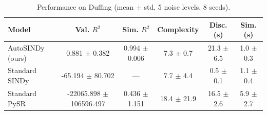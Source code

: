 \begin{table}[htbp]
\centering
\small
\renewcommand{\arraystretch}{1.2}
\caption{Performance on Duffing (mean $\pm$ std, 5 noise levels, 8 seeds).}
\label{tab:autosindy_duffing}
\begin{tabular}{lccccc}
\toprule
Model & Val. $R^2$ & Sim. $R^2$ & Complexity & Disc. (s) & Sim. (s) \\
\midrule
AutoSINDy (ours) & 0.881 $\pm$ 0.382 & 0.994 $\pm$ 0.006 & 7.3 $\pm$ 0.7 & 21.3 $\pm$ 6.5 & 1.0 $\pm$ 0.3 \\
Standard SINDy & -65.194 $\pm$ 80.702 & --- & 7.7 $\pm$ 4.4 & 0.5 $\pm$ 0.1 & 1.1 $\pm$ 0.4 \\
Standard PySR & -22065.898 $\pm$ 106596.497 & 0.436 $\pm$ 1.151 & 18.4 $\pm$ 21.9 & 16.5 $\pm$ 2.6 & 5.9 $\pm$ 2.7 \\
\bottomrule
\end{tabular}
\end{table}
